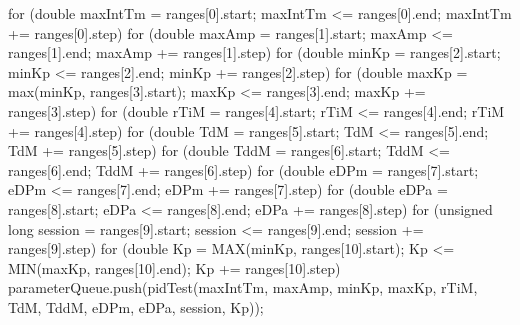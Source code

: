 \documentclass[a4paper,12pt]{article}
\begin{document}
\begin{lstlising}[language=C++]
{        for (double maxIntTm = ranges[0].start; maxIntTm <= ranges[0].end; maxIntTm += ranges[0].step)
        {
                for (double maxAmp = ranges[1].start; maxAmp <= ranges[1].end; maxAmp += ranges[1].step)
                {
                        for (double minKp = ranges[2].start; minKp <= ranges[2].end; minKp += ranges[2].step)
                        {
                                for (double maxKp = max(minKp, ranges[3].start);
                                         maxKp <= ranges[3].end; maxKp += ranges[3].step)
                                {
                                        for (double rTiM = ranges[4].start; rTiM <= ranges[4].end; rTiM += ranges[4].step)
                                        {
                                                for (double TdM = ranges[5].start; TdM <= ranges[5].end; TdM += ranges[5].step)
                                                {
                                                        for (double TddM = ranges[6].start; TddM <= ranges[6].end; TddM += ranges[6].step)
                                                        {
                                                                for (double eDPm = ranges[7].start; eDPm <= ranges[7].end; eDPm += ranges[7].step)
                                                                {
                                                                        for (double eDPa = ranges[8].start; eDPa <= ranges[8].end; eDPa += ranges[8].step)
                                                                        {
                                                                                for (unsigned long session = ranges[9].start; session <= ranges[9].end; session += ranges[9].step)
                                                                                {
                                                                                        for (double Kp = MAX(minKp, ranges[10].start);
                                                                                                 Kp <= MIN(maxKp, ranges[10].end); Kp += ranges[10].step)
                                                                                        {
                                                                                                parameterQueue.push(pidTest({maxIntTm, maxAmp, minKp, maxKp, rTiM, TdM, TddM, eDPm, eDPa, session, Kp}));
                                                                                        }
                                                                                }
                                                                        }
                                                                }
                                                        }
                                                }
                                        }
                                }
                        }
                }
        }

}
\end{lstlising}
\end{document}
